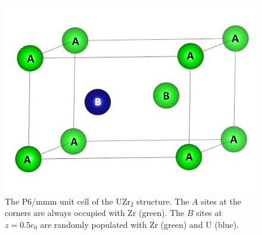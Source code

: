 \documentclass[preprint,12pt]{elsarticle}
\begin{document}
\begin{figure}[ht!]
    \centering
    \includegraphics[scale=0.475]{p6mmm_labelled.jpg}
    \caption{The P6/mmm unit cell of the UZr$_2$ structure. The $A$ sites at the corners are always occupied with Zr (green). The $B$ sites at $z=0.5c_0$ are randomly populated with Zr (green) and U (blue).}
    \label{fig:uzr2 structure}
\end{figure}
\end{document}
